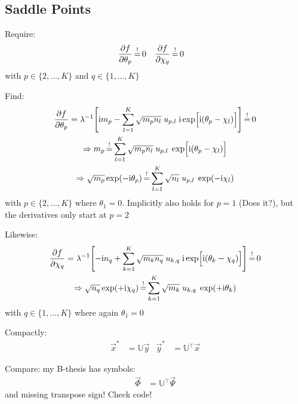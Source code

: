 \documentclass[
	english,
	a4paper,
	fontsize=10pt,
	parskip=half,
	titlepage=true,
	DIV=12,
	final
]{scrreprt}
\newcommand*{\Thus}{\ensuremath{\Rightarrow}\xspace}
\newcommand*{\transp}{\ensuremath{^\intercal}}
\newcommand*{\iunit}{\ensuremath{\mathrm{i}}}
\newcommand*{\equalCond}{  \mathop{=}\limits^!  }
\begin{document}
\subsection{Saddle Points}
\label{sec:Saddles}
Require:
\begin{align}
	\pdv{f}{\theta_p} &\equalCond 0
&
	\pdv{f}{\chi  _q} &\equalCond 0 
\end{align}
with $p \in \{2, \ldots, K\}$ and $q \in \{1, \ldots, K\}$

Find:
\begin{gather}
	\pdv{f}{\theta_p}
=
	\lambda^{-1}
	\qty[
		\iunit m_p
		-
		\sum_{l=1}^{K}
			\sqrt{m_p n_l} \; u_{p,l} \; \iunit \exp[ \Big. \iunit(\theta_p - \chi_l)]
	]
	\label{eqn:Jacobiantheta}
\equalCond
	0 \\
\Thus
	m_p
\equalCond
	\sum_{l=1}^{K}
		\sqrt{m_p n_l} \; u_{p,l} \; \exp[ \Big. \iunit(\theta_p - \chi_l) ] \\
\Thus
	\sqrt{m_p} \exp(-\iunit \theta_p)
\equalCond
	\sum_{l=1}^{K} \sqrt{n_l} \; u_{p,l} \; \exp(-\iunit\chi_l)
	\label{eqn:FourierLinkForward}
\end{gather}
with $p \in \{2, \ldots, K\}$ where $\theta_1 = 0$. Implicitly also holds for $p=1$ {\color{red}(Does it?)}, but the derivatives only start at $p=2$

Likewise:
\begin{gather}
	\pdv{f}{\chi_q}
=
	\lambda^{-1}
	\qty[
		-\iunit n_q
		+
		\sum_{k=1}^{K}
			\sqrt{m_k n_q} \; u_{k,q} \; \iunit \exp[ \Big. \iunit(\theta_k - \chi_q) ]
	]
	\label{eqn:JacobianChi}
\equalCond
	0 \\
\Thus
	\sqrt{n_q} \exp(+\iunit \chi_q)
\equalCond
	\sum_{k=1}^{K}
	\sqrt{m_k} \; u_{k,q} \; \exp(+\iunit\theta_k)
	\label{eqn:FourierLinkBackward}
\end{gather}
with $q \in \{1, \ldots, K\}$ where again $\theta_1 = 0$

Compactly:
\begin{align}
	\vec{x}^{*} &= \mathbb{U} \vec{y}
&
	\vec{y}^{*} &= \mathbb{U}\transp \vec{x}
	\label{eqn:MatrixCondition}
\end{align}

Compare: my B-thesis has symbols:
\begin{align}
	\vec{\Phi} &= \mathbb{U}\transp \vec{\Psi}
\end{align}
{\color{red} and missing transpose sign! Check code!}
\end{document}
